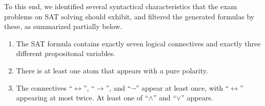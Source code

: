 To this end,
we identified several  syntactical characteristics that the exam problems on SAT solving should exhibit,
and filtered the generated formulas by these, as summarized  partially
below. 
%
\begin{enumerate}
    \item
        The SAT formula contains exactly seven logical connectives 
        and exactly three different propositonal variables. 
    \item\label{item:polarity}
        There is at least one atom that appears with a pure polarity.
    \item
        The connectives ``$\leftrightarrow$'', ``$\rightarrow$'', and ``$\lnot$'' appear at least once,
        with ``$\leftrightarrow$'' appearing at most twice.
        At least one of ``$\land$'' and ``$\lor$'' appears.
        
        

\end{enumerate}
